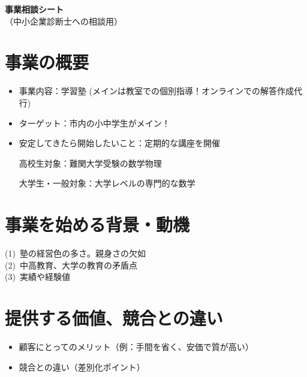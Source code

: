 ﻿\documentclass[12pt]{article}
\begin{document}
\begin{center}
    {\LARGE \bf 事業相談シート} \\
    \vspace{2mm}
    （中小企業診断士への相談用）
\end{center}

\vspace{3mm}

\section{事業の概要}
\begin{itemize}[leftmargin=1.5em]
  \item 事業内容：学習塾 (メインは教室での個別指導！オンラインでの解答作成代行)
  \item ターゲット：市内の小中学生がメイン！
  \item 安定してきたら開始したいこと：定期的な講座を開催
  
  \vspace{0,5mm}
  
  高校生対象：難関大学受験の数学物理
  
  \vspace{0.5mm}
  
  大学生・一般対象：大学レベルの専門的な数学
\end{itemize}

\section{事業を始める背景・動機}
(1)\ 塾の経営色の多さ。親身さの欠如\\

(2)\ 中高教育、大学の教育の矛盾点\\

(3)\ 実績や経験値\\


\section{提供する価値、競合との違い}
\begin{itemize}[leftmargin=1.5em]
  \item 顧客にとってのメリット（例：手間を省く、安価で質が高い）%
  \item 競合との違い（差別化ポイント）%
\end{itemize}
\end{document}
